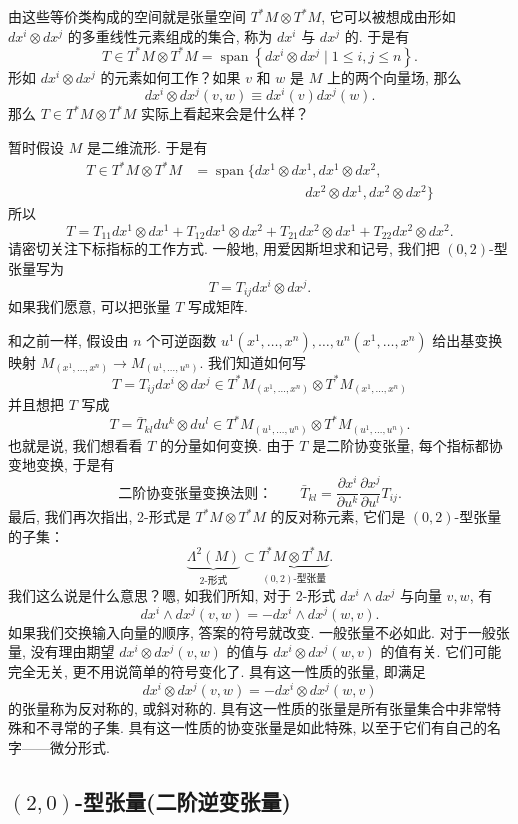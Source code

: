 由这些等价类构成的空间就是张量空间 $T^*M\otimes T^*M$, 它可以被想成由形如 $dx^i\otimes dx^j$ 的多重线性元素组成的集合, 称为 $dx^i$ 与 $dx^j$ 的. 于是有
\[
T\in T^*M\otimes T^*M=\operatorname{span}\left\{dx^i\otimes dx^j\mid 1\leq i,j\leq n\right\}.
\]
形如 $dx^i\otimes dx^j$ 的元素如何工作？如果 $v$ 和 $w$ 是 $M$ 上的两个向量场, 那么
\[
dx^i\otimes dx^j(v,w)\equiv dx^i(v)dx^j(w).
\]
那么 $T\in T^*M\otimes T^*M$ 实际上看起来会是什么样？

暂时假设 $M$ 是二维流形. 于是有
\[
\begin{aligned}
T\in T^*M\otimes T^*M&=\operatorname{span}\bigl\{dx^1\otimes dx^1,dx^1\otimes dx^2,\\
&\qquad\qquad\qquad\qquad dx^2\otimes dx^1,dx^2\otimes dx^2\bigr\}
\end{aligned}
\]
所以
\[
T=T_{11}dx^1\otimes dx^1+T_{12}dx^1\otimes dx^2+T_{21}dx^2\otimes dx^1+T_{22}dx^2\otimes dx^2.
\]
请密切关注下标指标的工作方式. 一般地, 用爱因斯坦求和记号, 我们把 $(0,2)$-型张量写为
\[
T=T_{ij}dx^i\otimes dx^j.
\]
如果我们愿意, 可以把张量 $T$ 写成矩阵.

和之前一样, 假设由 $n$ 个可逆函数 $u^1(x^1,\ldots,x^n),\ldots,u^n(x^1,\ldots,x^n)$ 给出基变换映射 $M_{(x^1,\ldots,x^n)}\to M_{(u^1,\ldots,u^n)}$. 我们知道如何写
\[
T=T_{ij}dx^i\otimes dx^j\in T^*M_{(x^1,\ldots,x^n)}\otimes T^*M_{(x^1,\ldots,x^n)}
\]
并且想把 $T$ 写成
\[
T=\bar{T}_{kl}du^k\otimes du^l\in T^*M_{(u^1,\ldots,u^n)}\otimes T^*M_{(u^1,\ldots,u^n)}.
\]
也就是说, 我们想看看 $T$ 的分量如何变换. 由于 $T$ 是二阶协变张量, 每个指标都协变地变换, 于是有
\[
\text{二阶协变张量变换法则：}\qquad \bar{T}_{kl}=\frac{\partial x^i}{\partial u^k}\frac{\partial x^j}{\partial u^l}T_{ij}.
\]
最后, 我们再次指出, 2-形式是 $T^*M\otimes T^*M$ 的反对称元素, 它们是 $(0,2)$-型张量的子集：
\[
\underbrace{\Lambda^2(M)}_{\text{2-形式}}\subset\underbrace{T^*M\otimes T^*M}_{(0,2)\text{-型张量}}.
\]
我们这么说是什么意思？嗯, 如我们所知, 对于 2-形式 $dx^i\wedge dx^j$ 与向量 $v,w$, 有
\[
dx^i\wedge dx^j(v,w)=-dx^i\wedge dx^j(w,v).
\]
如果我们交换输入向量的顺序, 答案的符号就改变. 一般张量不必如此. 对于一般张量, 没有理由期望 $dx^i\otimes dx^j(v,w)$ 的值与 $dx^i\otimes dx^j(w,v)$ 的值有关. 它们可能完全无关, 更不用说简单的符号变化了. 具有这一性质的张量, 即满足
\[
dx^i\otimes dx^j(v,w)=-dx^i\otimes dx^j(w,v)
\]
的张量称为反对称的, 或斜对称的. 具有这一性质的张量是所有张量集合中非常特殊和不寻常的子集. 具有这一性质的协变张量是如此特殊, 以至于它们有自己的名字——微分形式.

\subsection{$(2,0)$-型张量(二阶逆变张量)}

